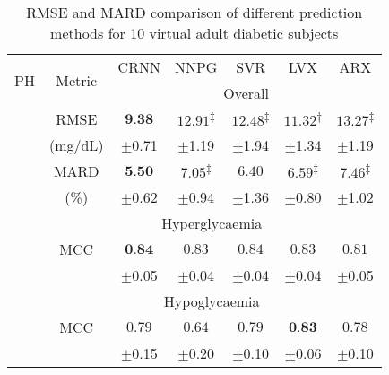 \documentclass[a4paper, 10 pt, twocolumn]{IEEEtran}
\begin{document}
\begin{table}[!ht]{
	\small
	\caption{RMSE and MARD comparison of different prediction methods for 10 virtual adult diabetic subjects }\label{table:Adult10RMSEMARD}
	\begin{tabular}{|c|c|c|c|c|c|c|}
		\hline
		 \multirow{2}{*}{PH}  & \multirow{2}{*}{Metric} & CRNN & NNPG & SVR & LVX & ARX \\
		\cline{3-7}
		 \multirow{13}{*}{30} &&\multicolumn{5}{c|}{Overall}\\
		\hline
		        & RMSE  & $\textbf{9.38}$ & $12.91$\textsuperscript{$\ddagger$} &$12.48$\textsuperscript{$\ddagger$} & $11.32$\textsuperscript{$\dagger$} & $13.27$\textsuperscript{$\ddagger$}\\
		                       &(mg/dL)&$\pm$0.71&$\pm$1.19&$\pm$1.94&$\pm$1.34&$\pm$1.19\\
		\cline{2-7}
		                       & MARD  & $\textbf{5.50}$ & $7.05$\textsuperscript{$\ddagger$} &$6.40$  & $6.59$\textsuperscript{$\ddagger$} & $7.46$\textsuperscript{$\ddagger$}  \\
		                       & (\%)  &$\pm$0.62&$\pm$0.94&$\pm$1.36&$\pm$0.80&$\pm$1.02\\
		\cline{2-7}
		                       &       \multicolumn{6}{c|}{Hyperglycaemia}\\
		\cline{2-7}
		                       & MCC & $\textbf{0.84}$ & $0.83$ &$0.84$ & $0.83$ & $0.81$  \\
		                       &     & $\pm$0.05&$\pm$0.04&$\pm$0.04&$\pm$0.04&$\pm$0.05\\
		\cline{2-7}
		                       &     \multicolumn{6}{c|}{Hypoglycaemia}\\
		\cline{2-7}
		                       & MCC & $0.79$ & $0.64$ &$0.79$ & $\textbf{0.83}$ & $0.78$  \\
		                       &     & $\pm$0.15&$\pm$0.20&$\pm$0.10&$\pm$0.06&$\pm$0.10\\
		

\end{tabular}}
\end{table}
\end{document}
